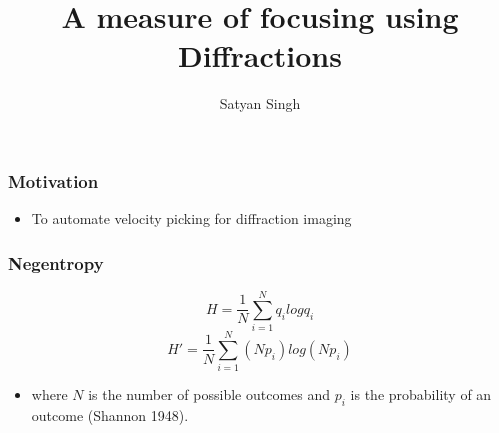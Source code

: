 

\title[]{A measure of focusing using Diffractions}
\subtitle{}
\author[]{Satyan Singh}
\date{}
\logo{}
\Large

\def\big#1{\begin{center} \LARGE \textbf{#1} \end{center}}
\def\cen#1{\begin{center}        \textbf{#1} \end{center}}

 { \cwpcover }


\begin{frame}
      {}
      {}
\end{frame}

\begin{frame} \frametitle{Motivation}

\begin{itemize}
   \item To automate velocity picking for diffraction imaging
\end{itemize}

\end{frame}
\begin{frame} \frametitle{Negentropy}


   \begin{equation} 
      H =\frac{1}{N} \sum_{i=1}^{N} q_i log q_i
   \end{equation}
  \begin{equation}
        H'= \frac{1}{N} \sum_{i=1}^{N} (Np_i) log(Np_i)
  \end{equation}
\begin{itemize}
 \item where $N$ is the number of possible outcomes and $p_i$ is the probability of an outcome (Shannon 1948).
\end{itemize}

\end{frame}


